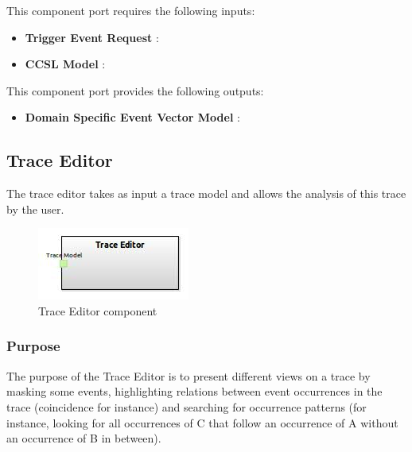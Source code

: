 \documentclass{gemoc} %
\begin{document}
This component port requires the following inputs:
\begin{itemize}
  \item \textbf{Trigger Event Request} :
  \item \textbf{CCSL Model} :
\end{itemize}

This component port provides the following outputs:
\begin{itemize}
  \item \textbf{Domain Specific Event Vector Model} :
\end{itemize}

\subsection{Trace Editor}
The trace editor takes as input a trace model and allows the analysis of this trace by the user.
\begin{figure}[htp]
	\begin{center}
	\includegraphics*[trim=0.0cm 0.0cm 0cm 0.0cm, clip=true, scale=1.0]{../images/generated/Generated_Trace Editor.jpg}
	\caption{Trace Editor component}
	\end{center}
\end{figure}

\subsubsection{Purpose}
The purpose of the Trace Editor is to present different views on a trace by masking some events, highlighting relations between event occurrences in the trace (coincidence for instance) and searching for occurrence patterns (for instance, looking for all occurrences of C that follow an occurrence of A without an occurrence of B in between).
 
\end{document}
